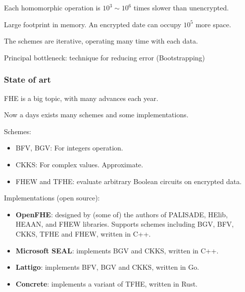 \documentclass[10pt,handout]{beamer}
\begin{document}
\begin{frame}
\begin{columns}
\end{columns}
\pause

Each homomorphic operation is $10^3 \sim 10^6$ times slower than unencrypted.
\pause

Large footprint in memory.
An encrypted date can occupy $10^5$ more space.

\pause
The schemes are iterative, operating many time with each data.
\pause

\begin{mdframed}[backgroundcolor=frenchblue!20]
  Principal bottleneck: technique for reducing error (Bootstrapping)
\end{mdframed}

\end{frame}


\begin{frame}
\frametitle{State of art}

FHE is a big topic, with many advances each year.
\vspace{-0.3cm}
\pause

Now a days exists many schemes and some implementations.
\vspace{-0.3cm}
\pause

Schemes:
\begin{itemize}\vspace{-0.3cm}
  \item BFV, BGV: For integers operation.\vspace{-0.3cm}\pause
  \item CKKS: For complex values. Approximate.\vspace{-0.3cm}\pause
  \item FHEW and TFHE:  evaluate arbitrary Boolean circuits on encrypted data.
\end{itemize}
\vspace{-0.3cm}
\pause

        Implementations (open source):
        \begin{itemize}\vspace{-0.3cm}
          \item \textbf{OpenFHE}: designed by (some of)
            the authors of PALISADE, HElib, HEAAN, and FHEW libraries.
            Supports schemes including BGV, BFV, CKKS, TFHE and FHEW,
            written in C++.\vspace{-0.3cm}\pause
          \item \textbf{Microsoft SEAL}: implements BGV and CKKS, written in C++.\vspace{-0.3cm}
          \pause
          \item \textbf{Lattigo}: implements BFV, BGV and CKKS, written in Go.\vspace{-0.3cm}
          \pause
          \item \textbf{Concrete}: implements a variant of TFHE, written in Rust.\vspace{-0.3cm}
        \end{itemize}

\end{frame}
\end{document}
